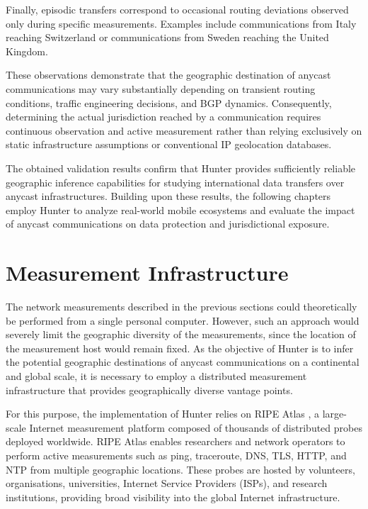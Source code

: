 Finally, episodic transfers correspond to occasional routing deviations observed only during specific measurements. Examples include communications from Italy reaching Switzerland or communications from Sweden reaching the United Kingdom.

These observations demonstrate that the geographic destination of anycast communications may vary substantially depending on transient routing conditions, traffic engineering decisions, and BGP dynamics. Consequently, determining the actual jurisdiction reached by a communication requires continuous observation and active measurement rather than relying exclusively on static infrastructure assumptions or conventional IP geolocation databases.

The obtained validation results confirm that Hunter provides sufficiently reliable geographic inference capabilities for studying international data transfers over anycast infrastructures. Building upon these results, the following chapters employ Hunter to analyze real-world mobile ecosystems and evaluate the impact of anycast communications on data protection and jurisdictional exposure.

\section{Measurement Infrastructure}
\label{sc:hunter_measurement_infrastructure}

The network measurements described in the previous sections could theoretically be performed from a single personal computer. However, such an approach would severely limit the geographic diversity of the measurements, since the location of the measurement host would remain fixed. As the objective of Hunter is to infer the potential geographic destinations of anycast communications on a continental and global scale, it is necessary to employ a distributed measurement infrastructure that provides geographically diverse vantage points.

For this purpose, the implementation of Hunter relies on RIPE Atlas \cite{HomeAtlas}, a large-scale Internet measurement platform composed of thousands of distributed probes deployed worldwide. RIPE Atlas enables researchers and network operators to perform active measurements such as ping, traceroute, DNS, TLS, HTTP, and NTP from multiple geographic locations. These probes are hosted by volunteers, organisations, universities, Internet Service Providers (ISPs), and research institutions, providing broad visibility into the global Internet infrastructure.

